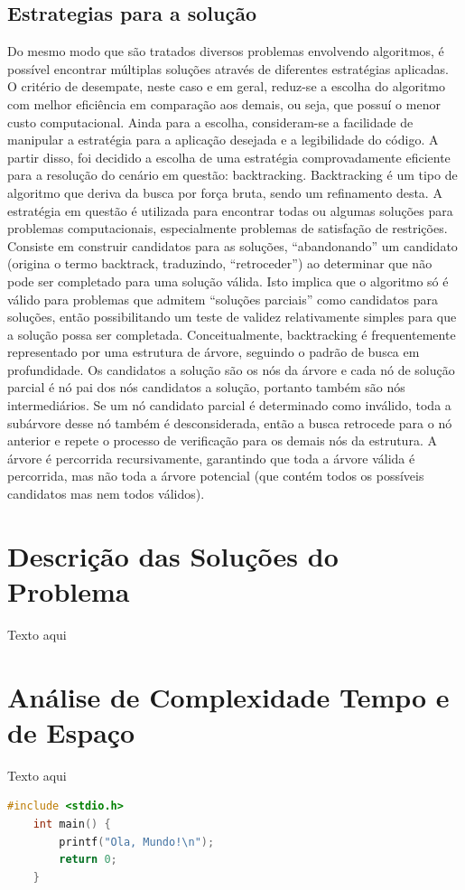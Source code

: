 \documentclass[relatorio]{IEEEtran}
\begin{document}
\subsection{Estrategias para a solução}
Do mesmo modo que são tratados diversos problemas envolvendo algoritmos, é possível encontrar múltiplas soluções através de diferentes estratégias aplicadas. O critério de desempate, neste caso e em geral, reduz-se a escolha do algoritmo com melhor eficiência em comparação aos demais, ou seja, que possuí o menor custo computacional. Ainda para a escolha, consideram-se a facilidade de manipular a estratégia para a aplicação desejada e a legibilidade do código. A partir disso, foi decidido a escolha de uma estratégia comprovadamente eficiente para a resolução do cenário em questão: backtracking. 
Backtracking é um tipo de algoritmo que deriva da busca por força bruta, sendo um refinamento desta. A estratégia em questão é utilizada para encontrar todas ou algumas soluções para problemas computacionais, especialmente problemas de satisfação de restrições. Consiste em construir candidatos para as soluções, “abandonando” um candidato (origina o termo backtrack, traduzindo, “retroceder”) ao determinar que não pode ser completado para uma solução válida. Isto implica que o algoritmo só é válido para problemas que admitem “soluções parciais” como candidatos para soluções, então possibilitando um teste de validez relativamente simples para que a solução possa ser completada.
Conceitualmente, backtracking é frequentemente representado por uma estrutura de árvore, seguindo o padrão de busca em profundidade. Os candidatos a solução são os nós da árvore e cada nó de solução parcial é nó pai dos nós candidatos a solução, portanto também são nós intermediários. Se um nó candidato parcial é determinado como inválido, toda a subárvore desse nó também é desconsiderada, então a busca retrocede para o nó anterior e repete o processo de verificação para os demais nós da estrutura. A árvore é percorrida recursivamente, garantindo que toda a árvore válida é percorrida, mas não toda a árvore potencial (que contém todos os possíveis candidatos mas nem todos válidos).

\section{Descrição das Soluções do Problema}
Texto aqui
\section{Análise de Complexidade Tempo e de Espaço}
Texto aqui
\begin{lstlisting}[language=C]
    #include <stdio.h>
    int main() {
        printf("Ola, Mundo!\n");
        return 0;
    }
\end{lstlisting}
\end{document}
